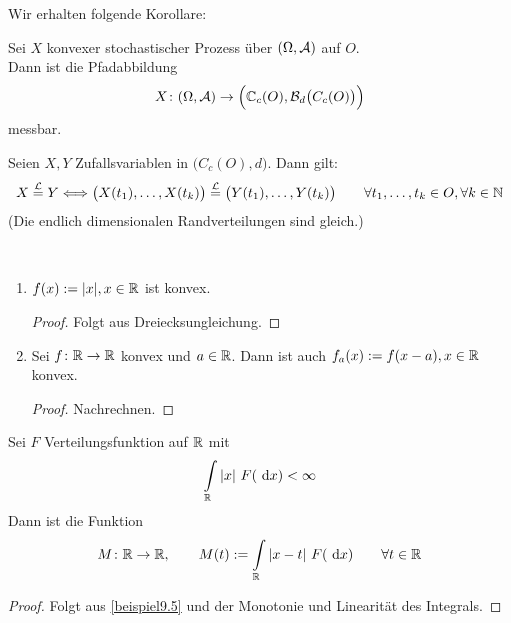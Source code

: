 Wir erhalten folgende Korollare:

\begin{korollar}\label{korollar9.3}
	 Sei $X$ konvexer stochastischer Prozess über $(\Omega,\mathcal{A})$ auf $O$.\\
	 Dann ist die Pfadabbildung
	 \begin{align*}
	 	X\colon(\Omega,\mathcal{A})\to\Big(\mathbb{C}_c(O),\mathcal{B}_d\big(C_c(O)\big)\Big)
	 \end{align*}
	 messbar.
\end{korollar}

\begin{korollar}\label{korollar9.4} %
	Seien $X,Y$ Zufallsvariablen in $\big(C_c(O),d\big)$.
	Dann gilt:
	\begin{align*}
		X\overset{\mathcal{L}}{=} Y\Longleftrightarrow
		\big(X(t_1),\ldots,X(t_k)\big)
		\overset{\mathcal{L}}{=}
		\big(Y(t_1),\ldots,Y(t_k)\big)
		\qquad\forall t_1,\ldots,t_k\in O,\forall k\in\mathbb{N}
	\end{align*}
	(Die endlich dimensionalen Randverteilungen sind gleich.)
\end{korollar}

\begin{beispiel}\label{beispiel9.5}\
	\begin{enumerate}[label=(\arabic*)]
		\item $f(x):=|x|,x\in\mathbb{R}$ ist konvex.
		\begin{proof}
			Folgt aus Dreiecksungleichung.
		\end{proof}
		\item Sei $f\colon\mathbb{R}\to\mathbb{R}$ konvex und $a\in\mathbb{R}$.
		Dann ist auch $f_a(x):=f(x-a),x\in\mathbb{R}$ konvex.
		\begin{proof}
			Nachrechnen.
		\end{proof}
	\end{enumerate}
\end{beispiel}

\begin{lemma}\label{lemma9.6}
	Sei $F$ Verteilungsfunktion auf $\mathbb{R}$ mit
	\begin{align*}
		\int\limits_{\mathbb{R}} |x|~F(\text{ d} x)<\infty
	\end{align*}
	Dann ist die Funktion
	\begin{align*}
		M\colon\mathbb{R}\to\mathbb{R},\qquad M(t):=\int\limits_{\mathbb{R}}|x-t|~F(\text{ d} x)\qquad\forall t\in\mathbb{R}
	\end{align*}
\end{lemma}

\begin{proof}
	Folgt aus \ref{beispiel9.5} und der Monotonie und Linearität des Integrals.
\end{proof}

